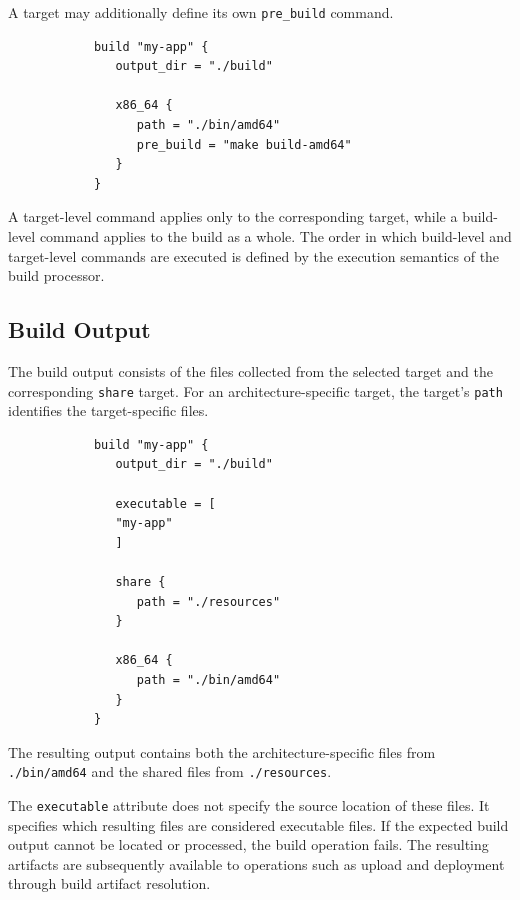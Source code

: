 \documentclass[11pt,a4paper]{article}
\begin{document}
    A target may additionally define its own \texttt{pre\_build} command.

    \begin{center}
        \begin{verbatim}
            build "my-app" {
               output_dir = "./build"

               x86_64 {
                  path = "./bin/amd64"
                  pre_build = "make build-amd64"
               }
            }
        \end{verbatim}
    \end{center}

    A target-level command applies only to the corresponding target, while a build-level command applies to the build as a whole.
    The order in which build-level and target-level commands are executed is defined by the execution semantics of the build processor.

    \subsection{Build Output}\label{subsec:build-output}

    The build output consists of the files collected from the selected target and the corresponding \texttt{share} target.
    For an architecture-specific target, the target's \texttt{path} identifies the target-specific files.

    \begin{center}
        \begin{verbatim}
            build "my-app" {
               output_dir = "./build"

               executable = [
               "my-app"
               ]

               share {
                  path = "./resources"
               }

               x86_64 {
                  path = "./bin/amd64"
               }
            }
        \end{verbatim}
    \end{center}

    The resulting output contains both the architecture-specific files from \texttt{./bin/amd64} and the shared files from \texttt{./resources}.

    The \texttt{executable} attribute does not specify the source location of these files.
    It specifies which resulting files are considered executable files.
    If the expected build output cannot be located or processed, the build operation fails.
    The resulting artifacts are subsequently available to operations such as upload and deployment through build artifact resolution.
\end{document}
